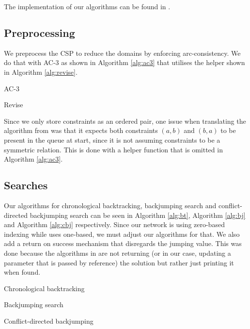 The implementation of our algorithms can be found in \cite{bib:git}.

\subsection{Preprocessing}
We preprocess the CSP to reduce the domains by enforcing arc-consistency. We do that with AC-3 as shown in Algorithm \ref{alg:ac3} that utilises the helper shown in Algorithm \ref{alg:revise}.

\begin{algorithm}
\begin{algorithmic}[H]

\end{algorithmic}
\caption{AC-3}
\label{alg:ac3}
\end{algorithm}

\begin{algorithm}
\begin{algorithmic}[H]

\end{algorithmic}
\caption{Revise}
\label{alg:revise}
\end{algorithm}

Since we only store constraints as an ordered pair, one issue when translating the algorithm from \cite{bib:art} was that it expects both constraints $(a,b)$ and $(b,a)$ to be present in the queue at start, since it is not assuming constraints to be a symmetric relation. This is done with a helper function that is omitted in Algorithm \ref{alg:ac3}.

\subsection{Searches}
Our algorithms for chronological backtracking, backjumping search and conflict-directed backjumping search can be seen in Algorithm \ref{alg:bt}, Algorithm \ref{alg:bj} and Algorithm \ref{alg:cbj} respectively. Since our network is using zero-based indexing while \cite{bib:art} uses one-based, we must adjust our algorithms for that. We also add a return on success mechanism that disregards the jumping value. This was done because the algorithms in \cite{bib:art} are not returning (or in our case, updating a parameter that is passed by reference) the solution but rather just printing it when found.

\begin{algorithm}
\begin{algorithmic}[H]

\end{algorithmic}
\caption{Chronological backtracking}
\label{alg:bt}
\end{algorithm}

\begin{algorithm}[H]
\begin{algorithmic}[H]

\end{algorithmic}
\caption{Backjumping search}
\label{alg:bj}
\end{algorithm}

\begin{algorithm}
\begin{algorithmic}[H]

\end{algorithmic}
\caption{Conflict-directed backjumping}
\label{alg:cbj}
\end{algorithm}
